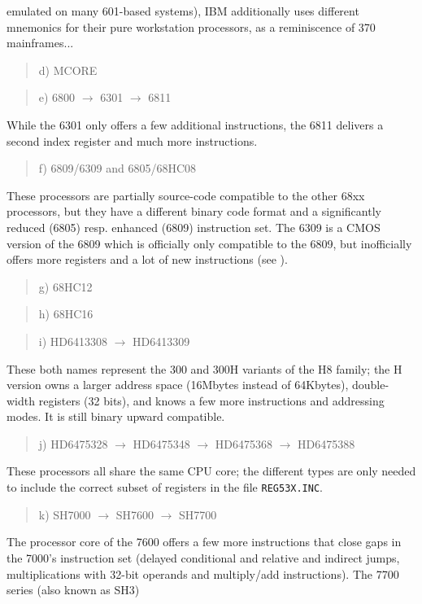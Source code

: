 \documentclass[12pt,twoside]{report}
\newcommand{\tty}[1]{{\tt #1}}
\begin{document}
emulated on many 601-based systems), IBM additionally uses different
mnemonics for their pure workstation processors, as a reminiscence of 370
mainframes...
\begin{quote}
d) MCORE
\end{quote}
\begin{quote}
e) 6800 $\rightarrow$ 6301 $\rightarrow$ 6811
\end{quote}
While the 6301 only offers a few additional instructions, the 6811
delivers a second index register and much more instructions.
\begin{quote}
f) 6809/6309 and 6805/68HC08
\end{quote}
These processors are partially source-code compatible to the other
68xx processors, but they have a different binary code format and a
significantly reduced (6805) resp. enhanced (6809) instruction set. 
The 6309 is a CMOS version of the 6809 which is officially only
compatible to the 6809, but inofficially offers more registers and a
lot of new instructions (see \cite{Kaku}).
\begin{quote}
g) 68HC12
\end{quote}
\begin{quote}
h) 68HC16
\end{quote}
\begin{quote}
i) HD6413308 $\rightarrow$ HD6413309
\end{quote}
These both names represent the 300 and 300H variants of the H8
family; the H version owns a larger address space (16Mbytes instead
of 64Kbytes), double-width registers (32 bits), and knows a few more
instructions and addressing modes.  It is still binary upward
compatible.
\begin{quote}
j) HD6475328 $\rightarrow$ HD6475348 $\rightarrow$ HD6475368 $\rightarrow$ HD6475388
\end{quote}
These processors all share the same CPU core; the different types are
only needed to include the correct subset of registers in the file
\tty{REG53X.INC}.
\begin{quote}
k) SH7000 $\rightarrow$ SH7600 $\longrightarrow$ SH7700
\end{quote}
The processor core of the 7600 offers a few more instructions that
close gaps in the 7000's instruction set (delayed conditional and
relative and indirect jumps, multiplications with 32-bit operands and
multiply/add instructions).  The 7700 series (also known as SH3)
\end{document}
